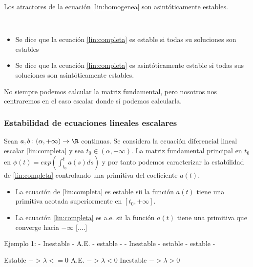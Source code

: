 \begin{ncor}
Los atractores de la ecuación \ref{lin:homogenea} son asintóticamente estables.
\end{ncor}

\begin{ndef}\hfill\\
\begin{itemize}
\item Se dice que la ecuación \ref{lin:completa} es estable si todas su soluciones son estables
\item Se dice que la ecuación \ref{lin:completa} es asintóticamente estable si todas sus soluciones son asintóticamente estables.
\end{itemize}
\end{ndef}

No siempre podemos calcular la matriz fundamental, pero nosotros nos centraremos en el caso escalar donde sí podemos calcularla.

\subsubsection{Estabilidad de ecuaciones lineales escalares}
Sean $a,b:(\alpha,+\infty)\to \R$ continuas. Se considera la ecuación diferencial lineal escalar \ref{lin:completa} y sea $t_0\in(\alpha,+\infty)$.
La matriz fundamental principal en $t_0$ en $\phi(t)=exp(\int^t_{t_0} a(s)ds)$ y por tanto podemos caracterizar la estabilidad de \ref{lin:completa} controlando una primitiva del coeficiente $a(t)$.
\begin{nprop}
\begin{itemize}
\item La ecuación de \ref{lin:completa} es estable sii la función $a(t)$ tiene una primitiva acotada superiormente en $[t_0,+\infty]$.
\item La ecuación \ref{lin:completa} es a.e. sii la función $a(t)$ tiene una primitiva que converge hacia $-\infty$ [....]
\end{itemize}
\end{nprop}
Ejemplo 1:
- Inestable
- A.E.
- estable
-
- Inestable
- estable
- estable
-


Estable $-> \lambda <= 0$
A.E. $-> \lambda < 0$
Inestable $-> \lambda > 0$

